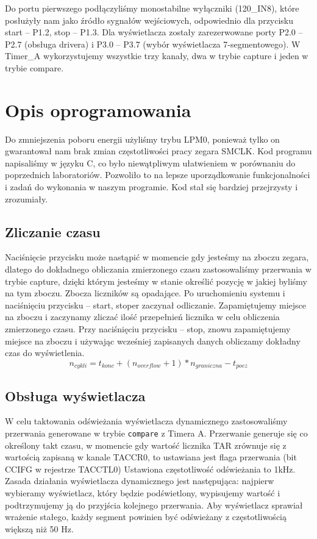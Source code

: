 \documentclass[a4paper,titlepage,11pt,floatssmall]{mwrep}
\begin{document}
Do portu pierwszego podłączyliśmy monostabilne wyłączniki (120\_{}IN8), które posłużyły nam jako źródło sygnałów wejściowych, odpowiednio dla przycisku start – P1.2,  stop – P1.3. Dla wyświetlacza zostały zarezerwowane porty P2.0 – P2.7 (obsługa drivera) i P3.0 – P3.7 (wybór wyświetlacza 7-segmentowego). W Timer\_{}A wykorzystujemy wszystkie trzy kanały, dwa w trybie capture i jeden w trybie compare. 

\section{Opis oprogramowania}

Do zmniejszenia poboru energii użyliśmy trybu LPM0, ponieważ tylko on gwarantował nam brak zmian częstotliwości pracy zegara SMCLK. Kod programu napisaliśmy w języku C, co było niewątpliwym ułatwieniem w porównaniu do poprzednich laboratoriów.  Pozwoliło to na lepsze uporządkowanie funkcjonalności i zadań do wykonania w naszym programie. Kod stał się bardziej przejrzysty i zrozumiały. 

\subsection{Zliczanie czasu}
\indent 

Naciśnięcie przycisku może nastąpić w momencie gdy jesteśmy na zboczu zegara, dlatego do dokładnego obliczania zmierzonego czasu zastosowaliśmy przerwania w trybie capture, dzięki którym jesteśmy w stanie określić pozycję w jakiej byliśmy na tym zboczu.  Zbocza liczników są opadające. Po uruchomieniu systemu i naciśnięciu przycisku – start, stoper zaczynał odliczanie. Zapamiętujemy miejsce na zboczu i zaczynamy zliczać ilość przepełnień licznika w celu obliczenia zmierzonego czasu. Przy naciśnięciu przycisku – stop, znowu zapamiętujemy miejsce na zboczu i używając wcześniej zapisanych danych obliczamy dokładny czas do wyświetlenia.
\begin{equation*}
n_{cykli} = t_{konc} + (n_{overflow} + 1)*n_{graniczna} - t_{pocz} 
\end{equation*} 

\subsection{Obsługa wyświetlacza}
\indent 

W celu taktowania odświeżania wyświetlacza dynamicznego zastosowaliśmy przerwania generowane w trybie \texttt{compare} z Timera A. Przerwanie generuje się co określony takt czasu, w momencie gdy wartość licznika TAR zrównuje się z wartością zapisaną w kanale TACCR0, to ustawiana jest flaga przerwania (bit CCIFG w rejestrze TACCTL0) Ustawiona częstotliwość odświeżania to 1kHz. Zasada działania wyświetlacza dynamicznego jest następująca: najpierw wybieramy wyświetlacz, który będzie podświetlony, wypisujemy wartość i podtrzymujemy ją do przyjścia kolejnego przerwania. Aby wyświetlacz sprawiał wrażenie stałego, każdy segment powinien być odświeżany z częstotliwością większą niż 50 Hz. \\
\end{document}

